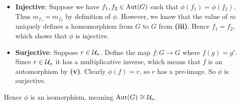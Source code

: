 \begin{questions}
\begin{partquestions}{\roman*}
\begin{itemize}
            \item \textbf{Injective}: Suppose we have $f_1, f_2 \in \mathrm{Aut}(G)$ such that $\phi(f_1) = \phi(f_2)$. Thus $m_{f_1} = m_{f_2}$ by definition of $\phi$. However, we know that the value of $m$ uniquely defines a homomorphism from $G$ to $G$ from \textbf{(iii)}. Hence $f_1 = f_2$, which shows that $\phi$ is injective.

            \item \textbf{Surjective}: Suppose $r \in \mathcal{U}_{n}$. Define the map $f: G \to G$ where $f(g) = g^r$. Since $r \in \mathcal{U}_{n}$ it has a multiplicative inverse, which means that $f$ is an automorphism by \textbf{(v)}. Clearly $\phi(f) = r$, so $r$ has a pre-image. So $\phi$ is surjective.
        \end{itemize}
        Hence $\phi$ is an isomorphism, meaning $\mathrm{Aut}(G) \cong \mathcal{U}_{n}$.
    \end{partquestions}
\end{questions}
